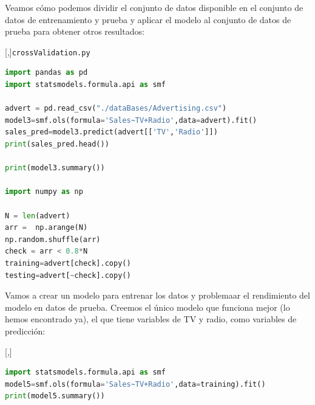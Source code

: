 Veamos cómo podemos dividir el conjunto de datos disponible en el conjunto de datos de entrenamiento y prueba
y aplicar el modelo al conjunto de datos de prueba para obtener otros resultados:

[,]{\texttt{crossValidation.py}}
\begin{lstlisting}[language=Python]
import pandas as pd
import statsmodels.formula.api as smf

advert = pd.read_csv("./dataBases/Advertising.csv")
model3=smf.ols(formula='Sales~TV+Radio',data=advert).fit()
sales_pred=model3.predict(advert[['TV','Radio']])
print(sales_pred.head())

print(model3.summary())

import numpy as np

N = len(advert)
arr =  np.arange(N)
np.random.shuffle(arr)
check = arr < 0.8*N
training=advert[check].copy()
testing=advert[~check].copy()
\end{lstlisting}


Vamos a crear un modelo para entrenar los datos y problemaar el rendimiento del modelo en
datos de prueba. Creemos el único modelo que funciona mejor (lo hemos encontrado ya),
el que tiene variables de TV y radio, como variables de predicción:

[,]{}
\begin{lstlisting}[language=Python]
import statsmodels.formula.api as smf
model5=smf.ols(formula='Sales~TV+Radio',data=training).fit()
print(model5.summary())
\end{lstlisting}

